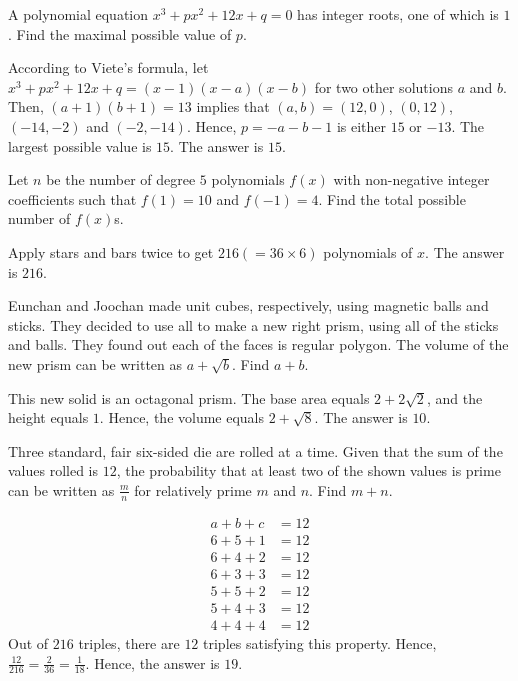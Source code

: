 \begin{problem}
A polynomial equation $x^3+px^2+12x+q=0$ has integer roots, one of which is $1$. Find the maximal possible value of $p$.
\end{problem}

\begin{solution}
According to Viete's formula, let $x^3+px^2+12x+q=(x-1)(x-a)(x-b)$ for two other solutions $a$ and $b$. Then, $(a+1)(b+1)=13$ implies that $(a,b)=(12,0)$, $(0,12)$, $(-14,-2)$ and $(-2,-14)$. Hence, $p=-a-b-1$ is either $15$ or $-13$. The largest possible value is $15$. The answer is $15$.
\end{solution}

\begin{problem}
Let $n$ be the number of degree $5$ polynomials $f(x)$ with non-negative integer coefficients such that $f(1)=10$ and $f(-1)=4$. Find the total possible number of $f(x)$s.
\end{problem}

\begin{solution}
Apply stars and bars twice to get $216(=36\times6)$ polynomials of $x$. The answer is $216$.
\end{solution}

\begin{problem}
Eunchan and Joochan made unit cubes, respectively, using magnetic balls and sticks. They decided to use all to make a new right prism, using all of the sticks and balls. They found out each of the faces is regular polygon. The volume of the new prism can be written as $a+\sqrt{b}$. Find $a+b$.
\end{problem}

\begin{solution}
This new solid is an octagonal prism. The base area equals $2+2\sqrt{2}$, and the height equals $1$. Hence, the volume equals $2+\sqrt{8}$. The answer is $10$.
\end{solution}

\begin{problem}
Three standard, fair six-sided die are rolled at a time. Given that the sum of the values rolled is $12$, the probability that at least two of the shown values is prime can be written as $\frac{m}{n}$ for relatively prime $m$ and $n$. Find $m+n$.
\end{problem}


\begin{solution}
\begin{align*}
a+b+c&=12\\
6+5+1&=12\\ 
6+4+2&=12\\
6+3+3&=12\\ 
5+5+2&=12\\ 
5+4+3&=12\\ 
4+4+4&=12
\end{align*}
Out of $216$ triples, there are $12$ triples satisfying this property. Hence, $\frac{12}{216}=\frac{2}{36}=\frac{1}{18}$. Hence, the answer is $19$.
\end{solution}

